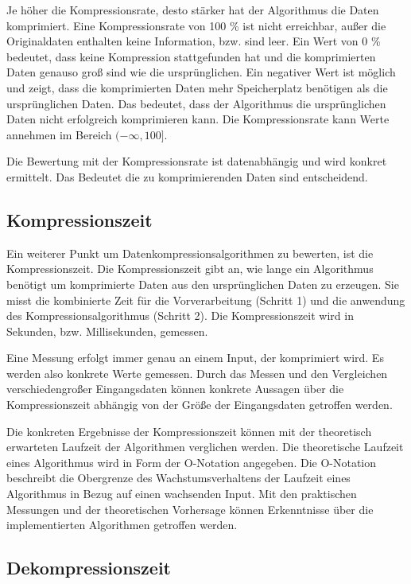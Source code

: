 \documentclass[conference]{IEEEtran}
\begin{document}
Je höher die Kompressionsrate, desto stärker hat der Algorithmus die Daten 
komprimiert. 
Eine Kompressionsrate von 100 \% ist nicht erreichbar, außer die Originaldaten enthalten
keine Information, bzw. sind leer. 
Ein Wert von 0 \% bedeutet, dass keine Kompression stattgefunden hat und die komprimierten 
Daten genauso groß sind wie die ursprünglichen.
Ein negativer Wert ist möglich und zeigt, dass die komprimierten Daten mehr Speicherplatz 
benötigen als die ursprünglichen Daten. 
Das bedeutet, dass der Algorithmus die ursprünglichen Daten nicht erfolgreich 
komprimieren kann.
Die Kompressionsrate kann Werte annehmen im Bereich $(-\infty, 100]$.

Die Bewertung mit der Kompressionsrate ist datenabhängig und wird konkret 
ermittelt. 
Das Bedeutet die zu komprimierenden Daten sind entscheidend.

\subsection{Kompressionszeit}

Ein weiterer Punkt um Datenkompressionsalgorithmen zu bewerten, ist die 
Kompressionszeit.
Die Kompressionszeit gibt an, wie lange ein Algorithmus benötigt um 
komprimierte Daten aus den ursprünglichen Daten zu erzeugen.
Sie misst die kombinierte Zeit für die Vorverarbeitung (Schritt 1) und die 
anwendung des Kompressionsalgorithmus (Schritt 2).
Die Kompressionszeit wird in Sekunden, bzw. Millisekunden, gemessen.

Eine Messung erfolgt immer genau an einem Input, der komprimiert wird.
Es werden also konkrete Werte gemessen.
Durch das Messen und den Vergleichen verschiedengroßer Eingangsdaten können konkrete
Aussagen über die Kompressionszeit abhängig von der Größe der 
Eingangsdaten getroffen werden.

Die konkreten Ergebnisse der Kompressionszeit können mit der 
theoretisch erwarteten Laufzeit der Algorithmen verglichen werden.
Die theoretische Laufzeit eines Algorithmus wird in Form der O-Notation
angegeben.
Die O-Notation beschreibt die Obergrenze des Wachstumsverhaltens der Laufzeit 
eines Algorithmus in Bezug auf einen wachsenden Input. \cite{chivers}
Mit den praktischen Messungen und der theoretischen Vorhersage können 
Erkenntnisse über die implementierten Algorithmen getroffen werden. 


\subsection{Dekompressionszeit}
\end{document}
